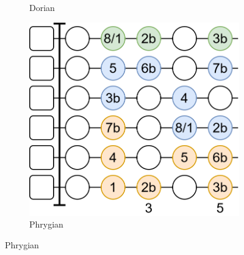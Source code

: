 \begin{figure}[h]
\begin{subfigure}[b]{0.31\textwidth}
		\caption{Dorian}
		\label{fig:guitar_mode_shape_dorian}
	\end{subfigure}
	\hfill
	\begin{subfigure}[b]{0.31\textwidth}
		\centering
		\includegraphics[height=0.175\textheight]{../../Images/PhrygianScaleShape.png}
		\caption{Phrygian}
		\label{fig:guitar_mode_shape_phrygian}
	\end{subfigure}
	
	\vspace{0.5cm}
	

\end{figure}

